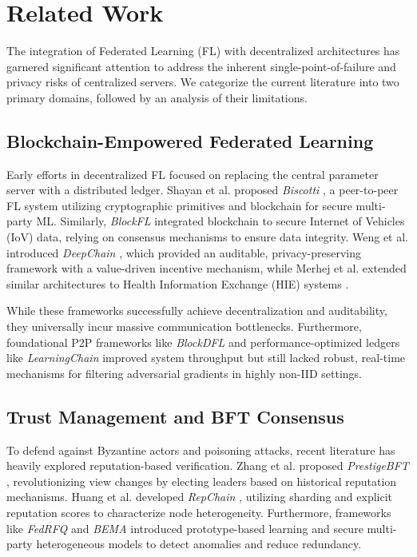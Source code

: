 \documentclass[conference]{IEEEtran}
\begin{document}
\section{Related Work}
The integration of Federated Learning (FL) with decentralized architectures has garnered significant attention to address the inherent single-point-of-failure and privacy risks of centralized servers. We categorize the current literature into two primary domains, followed by an analysis of their limitations.

\subsection{Blockchain-Empowered Federated Learning}
Early efforts in decentralized FL focused on replacing the central parameter server with a distributed ledger. Shayan et al. proposed \textit{Biscotti} \cite{biscotti}, a peer-to-peer FL system utilizing cryptographic primitives and blockchain for secure multi-party ML. Similarly, \textit{BlockFL} \cite{blockfl} integrated blockchain to secure Internet of Vehicles (IoV) data, relying on consensus mechanisms to ensure data integrity. Weng et al. introduced \textit{DeepChain} \cite{deepchain2021}, which provided an auditable, privacy-preserving framework with a value-driven incentive mechanism, while Merhej et al. extended similar architectures to Health Information Exchange (HIE) systems \cite{deepchain2023}. 

While these frameworks successfully achieve decentralization and auditability, they universally incur massive communication bottlenecks. Furthermore, foundational P2P frameworks like \textit{BlockDFL} \cite{blockdfl} and performance-optimized ledgers like \textit{LearningChain} \cite{learningchain} improved system throughput but still lacked robust, real-time mechanisms for filtering adversarial gradients in highly non-IID settings.

\subsection{Trust Management and BFT Consensus}
To defend against Byzantine actors and poisoning attacks, recent literature has heavily explored reputation-based verification. Zhang et al. proposed \textit{PrestigeBFT} \cite{prestigebft}, revolutionizing view changes by electing leaders based on historical reputation mechanisms. Huang et al. developed \textit{RepChain} \cite{repchain}, utilizing sharding and explicit reputation scores to characterize node heterogeneity. Furthermore, frameworks like \textit{FedRFQ} \cite{fedrfq} and \textit{BEMA} \cite{bema} introduced prototype-based learning and secure multi-party heterogeneous models to detect anomalies and reduce redundancy. 
\end{document}
